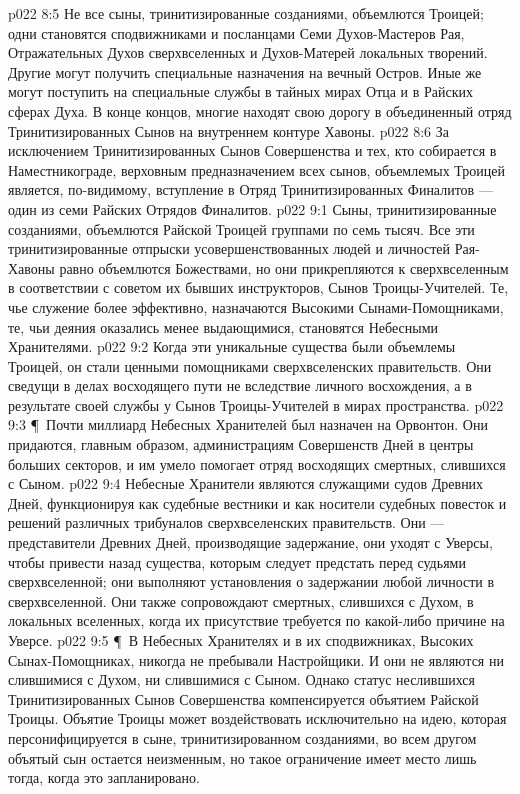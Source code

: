 \vs p022 8:5 Не все сыны, тринитизированные созданиями, объемлются Троицей; одни становятся сподвижниками и посланцами Семи Духов\hyp{}Мастеров Рая, Отражательных Духов сверхвселенных и Духов\hyp{}Матерей локальных творений. Другие могут получить специальные назначения на вечный Остров. Иные же могут поступить на специальные службы в тайных мирах Отца и в Райских сферах Духа. В конце концов, многие находят свою дорогу в объединенный отряд Тринитизированных Сынов на внутреннем контуре Хавоны.
\vs p022 8:6 За исключением Тринитизированных Сынов Совершенства и тех, кто собирается в Наместникограде, верховным предназначением всех сынов, объемлемых Троицей является, по\hyp{}видимому, вступление в Отряд Тринитизированных Финалитов --- один из семи Райских Отрядов Финалитов.
\vs p022 9:1 Сыны, тринитизированные созданиями, объемлются Райской Троицей группами по семь тысяч. Все эти тринитизированные отпрыски усовершенствованных людей и личностей Рая\hyp{}Хавоны равно объемлются Божествами, но они прикрепляются к сверхвселенным в соответствии с советом их бывших инструкторов, Сынов Троицы\hyp{}Учителей. Те, чье служение более эффективно, назначаются Высокими Сынами\hyp{}Помощниками, те, чьи деяния оказались менее выдающимися, становятся Небесными Хранителями.
\vs p022 9:2 Когда эти уникальные существа были объемлемы Троицей, он стали ценными помощниками сверхвселенских правительств. Они сведущи в делах восходящего пути не вследствие личного восхождения, а в результате своей службы у Сынов Троицы\hyp{}Учителей в мирах пространства.
\vs p022 9:3 \P\ Почти миллиард Небесных Хранителей был назначен на Орвонтон. Они придаются, главным образом, администрациям Совершенств Дней в центры больших секторов, и им умело помогает отряд восходящих смертных, слившихся с Сыном.
\vs p022 9:4 Небесные Хранители являются служащими судов Древних Дней, функционируя как судебные вестники и как носители судебных повесток и решений различных трибуналов сверхвселенских правительств. Они --- представители Древних Дней, производящие задержание, они уходят с Уверсы, чтобы привести назад существа, которым следует предстать перед судьями сверхвселенной; они выполняют установления о задержании любой личности в сверхвселенной. Они также сопровождают смертных, слившихся с Духом, в локальных вселенных, когда их присутствие требуется по какой\hyp{}либо причине на Уверсе.
\vs p022 9:5 \P\ В Небесных Хранителях и в их сподвижниках, Высоких Сынах\hyp{}Помощниках, никогда не пребывали Настройщики. И они не являются ни слившимися с Духом, ни слившимися с Сыном. Однако статус неслившихся Тринитизированных Сынов Совершенства компенсируется объятием Райской Троицы. Объятие Троицы может воздействовать исключительно на идею, которая персонифицируется в сыне, тринитизированном созданиями, во всем другом объятый сын остается неизменным, но такое ограничение имеет место лишь тогда, когда это запланировано.
